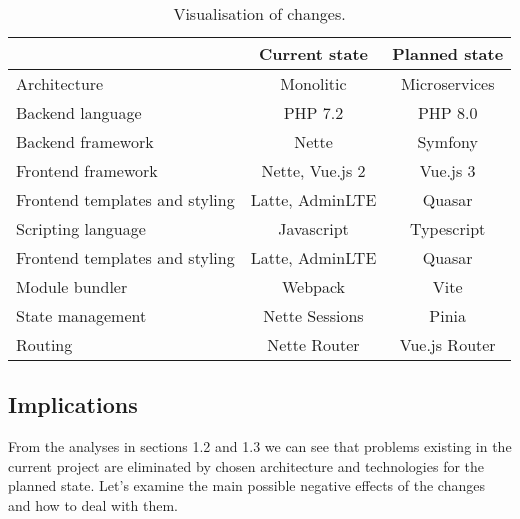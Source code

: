 \begin{table}[ht]
\begin{tabular}{l|c|c|}
\textbf{}                                            & \textbf{Current state} & \textbf{Planned state} \\ \hline
\multicolumn{1}{|l|}{Architecture}                   & Monolitic              & Microservices          \\ \hline
\multicolumn{1}{|l|}{Backend language}               & PHP 7.2                & PHP 8.0                \\ \hline
\multicolumn{1}{|l|}{Backend framework}              & Nette                  & Symfony                \\ \hline
\multicolumn{1}{|l|}{Frontend framework}             & Nette, Vue.js 2        & Vue.js 3               \\ \hline
\multicolumn{1}{|l|}{Frontend templates and styling} & Latte, AdminLTE        & Quasar                 \\ \hline
\multicolumn{1}{|l|}{Scripting language}             & Javascript             & Typescript             \\ \hline
\multicolumn{1}{|l|}{Frontend templates and styling} & Latte, AdminLTE        & Quasar                 \\ \hline
\multicolumn{1}{|l|}{Module bundler}                 & Webpack                & Vite                   \\ \hline
\multicolumn{1}{|l|}{State management}               & Nette Sessions         & Pinia                  \\ \hline
\multicolumn{1}{|l|}{Routing}                        & Nette Router           & Vue.js Router          \\ \hline
\end{tabular}
\caption{\label{demo-table}Visualisation of changes.}
\end{table}

\subsection{Implications} From the analyses in sections 1.2 and 1.3 we can see that problems existing in the current project are eliminated by chosen architecture and technologies for the planned state. Let's examine the main possible negative effects of the changes and how to deal with them.

